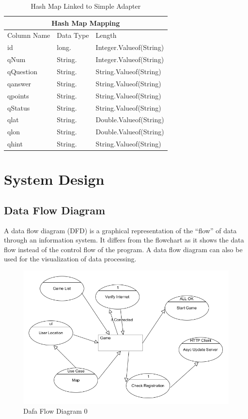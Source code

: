 \begin {table}[H]
\begin{center}
\begin{tabular}{ |l|l|l| }
  \hline
  \multicolumn{3}{|c|}{Hash Map Mapping} \\
    \hline
  Column Name&Data Type& Length \\
  \hline


id&long.&Integer.Valueof(String) \\
qNum&String.&Integer.Valueof(String)\\
qQuestion&String.&String.Valueof(String)\\
qanswer&String.&String.Valueof(String)\\
qpoints&String.&String.Valueof(String)\\
qStatus&String.&String.Valueof(String)\\
qlat&String.&Double.Valueof(String)\\
qlon&String.&Double.Valueof(String)\\
qhint&String.&String.Valueof(String)\\
  \hline
\end{tabular}
\caption {Hash Map Linked to Simple Adapter} \label{tab:title}
\label{the-label-for-cross-referencing}
\end{center}
\end {table}



\chapter{System Design}

\section{Data Flow Diagram}
A data flow diagram (DFD) is a graphical representation of the “flow” of data through an information system. It differs from the flowchart as it shows the data flow instead of the control flow of the program. A data flow diagram can also be used for the visualization of data processing. \\

\begin{figure}[ht!]
\left
\includegraphics[width=150mm]{images/dfd0}
\caption{Dafa Flow Diagram 0}
\label{overflow}
\end{figure}
\newpage

